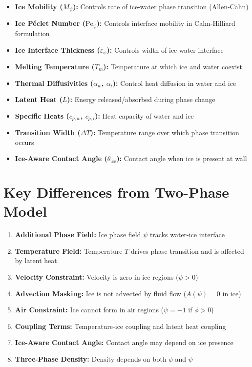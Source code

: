 \documentclass[12pt]{article}
\begin{document}
\begin{itemize}
    \item \textbf{Ice Mobility ($M_\psi$):} Controls rate of ice-water phase transition (Allen-Cahn)
    \item \textbf{Ice Péclet Number ($\text{Pe}_\psi$):} Controls interface mobility in Cahn-Hilliard formulation
    \item \textbf{Ice Interface Thickness ($\varepsilon_\psi$):} Controls width of ice-water interface
    \item \textbf{Melting Temperature ($T_m$):} Temperature at which ice and water coexist
    \item \textbf{Thermal Diffusivities ($\alpha_w$, $\alpha_i$):} Control heat diffusion in water and ice
    \item \textbf{Latent Heat ($L$):} Energy released/absorbed during phase change
    \item \textbf{Specific Heats ($c_{p,w}$, $c_{p,i}$):} Heat capacity of water and ice
    \item \textbf{Transition Width ($\Delta T$):} Temperature range over which phase transition occurs
    \item \textbf{Ice-Aware Contact Angle ($\theta_{\text{ice}}$):} Contact angle when ice is present at wall
\end{itemize}

\section{Key Differences from Two-Phase Model}

\begin{enumerate}
    \item \textbf{Additional Phase Field:} Ice phase field $\psi$ tracks water-ice interface
    \item \textbf{Temperature Field:} Temperature $T$ drives phase transition and is affected by latent heat
    \item \textbf{Velocity Constraint:} Velocity is zero in ice regions ($\psi > 0$)
    \item \textbf{Advection Masking:} Ice is not advected by fluid flow ($A(\psi) = 0$ in ice)
    \item \textbf{Air Constraint:} Ice cannot form in air regions ($\psi = -1$ if $\phi > 0$)
    \item \textbf{Coupling Terms:} Temperature-ice coupling and latent heat coupling
    \item \textbf{Ice-Aware Contact Angle:} Contact angle may depend on ice presence
    \item \textbf{Three-Phase Density:} Density depends on both $\phi$ and $\psi$
\end{enumerate}
\end{document}
